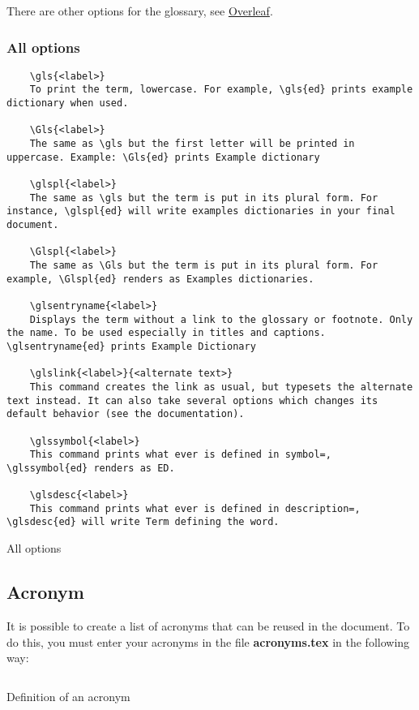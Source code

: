 There are other options for the glossary, see
\href{https://fr.overleaf.com/learn/latex/Glossaries}{Overleaf}.

\subsubsection{All options}

\begin{code}
    \begin{verbatim}
    \gls{<label>}
    To print the term, lowercase. For example, \gls{ed} prints example dictionary when used.

    \Gls{<label>}
    The same as \gls but the first letter will be printed in uppercase. Example: \Gls{ed} prints Example dictionary

    \glspl{<label>}
    The same as \gls but the term is put in its plural form. For instance, \glspl{ed} will write examples dictionaries in your final document.

    \Glspl{<label>}
    The same as \Gls but the term is put in its plural form. For example, \Glspl{ed} renders as Examples dictionaries.

    \glsentryname{<label>}
    Displays the term without a link to the glossary or footnote. Only the name. To be used especially in titles and captions. \glsentryname{ed} prints Example Dictionary

    \glslink{<label>}{<alternate text>}
    This command creates the link as usual, but typesets the alternate text instead. It can also take several options which changes its default behavior (see the documentation).

    \glssymbol{<label>}
    This command prints what ever is defined in symbol=, \glssymbol{ed} renders as ED.

    \glsdesc{<label>}
    This command prints what ever is defined in description=, \glsdesc{ed} will write Term defining the word.
    \end{verbatim}
    \caption{All options}
\end{code}

\subsection{Acronym} \label{acronym}
It is possible to create a list of acronyms that can be reused in the document.
To do this, you must enter your acronyms in the file \textbf{acronyms.tex} in the following way:
\begin{code}
    \inputminted{latex}{./acronyms.tex}
    \caption{Definition of an acronym}
\end{code}

